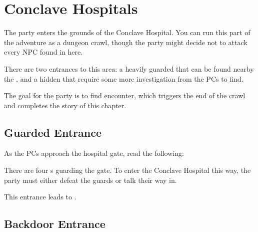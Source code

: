 \section{Conclave Hospitals}
\label{sec:conclaveHospital}

The party enters the grounds of the Conclave Hospital. You can run this part of the adventure as a dungeon crawl, though the party might decide not to attack every NPC found in here.

There are two entrances to this area: a heavily guarded  that can be found nearby the \locationPalanaeum{}, and a hidden  that require some more investigation from the PCs to find.

The goal for the party is to find  encounter, which triggers the end of the crawl and completes the story of this chapter.




\subsection{Guarded Entrance}
\label{ssec:conclaveHospitalEntrance}

As the PCs approach the hospital gate, read the following:


There are four \enemyDiagramMuscle{}s guarding the gate. To enter the Conclave Hospital this way, the party must either defeat the guards or talk their way in.

This entrance leads to .




\subsection{Backdoor Entrance}
\label{ssec:conclaveHospitalBackdoor}

